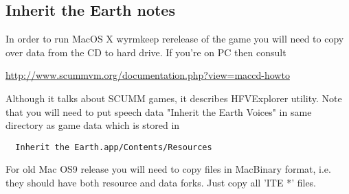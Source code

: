 \subsection{Inherit the Earth notes}
In order to run MacOS X wyrmkeep rerelease of the game you will need to copy
over data from the CD to hard drive. If you're on PC then consult

\url{http://www.scummvm.org/documentation.php?view=maccd-howto}

Although it talks about SCUMM games, it describes HFVExplorer utility. Note
that you will need to put speech data "Inherit the Earth Voices" in same
directory as game data which is stored in

\begin{verbatim}
  Inherit the Earth.app/Contents/Resources
\end{verbatim}

For old Mac OS9 release you will need to copy files in MacBinary format,
i.e. they should have both resource and data forks. Just copy all 'ITE *' files.
